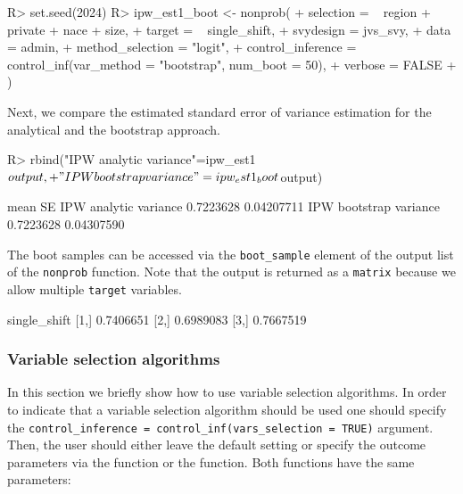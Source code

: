 \documentclass[
]{jss}
\begin{document}
\begin{CodeChunk}
\begin{CodeInput}
R> set.seed(2024)
R> ipw_est1_boot <- nonprob(
+   selection = ~ region + private + nace + size,
+   target = ~ single_shift,
+   svydesign = jvs_svy,
+   data = admin,
+   method_selection = "logit",
+   control_inference = control_inf(var_method = "bootstrap", num_boot = 50),
+   verbose = FALSE
+ )
\end{CodeInput}
\end{CodeChunk}

Next, we compare the estimated standard error of variance estimation for
the analytical and the bootstrap approach.

\begin{CodeChunk}
\begin{CodeInput}
R> rbind("IPW analytic variance"=ipw_est1$output,
+       "IPW bootstrap variance"=ipw_est1_boot$output)
\end{CodeInput}
\begin{CodeOutput}
                            mean         SE
IPW analytic variance  0.7223628 0.04207711
IPW bootstrap variance 0.7223628 0.04307590
\end{CodeOutput}
\end{CodeChunk}

The boot samples can be accessed via the \texttt{boot\_sample} element
of the output list of the \texttt{nonprob} function. Note that the
output is returned as a \texttt{matrix} because we allow multiple
\texttt{target} variables.

\begin{CodeChunk}
\begin{CodeOutput}
     single_shift
[1,]    0.7406651
[2,]    0.6989083
[3,]    0.7667519
\end{CodeOutput}
\end{CodeChunk}

\subsubsection{Variable selection
algorithms}\label{variable-selection-algorithms}

In this section we briefly show how to use variable selection
algorithms. In order to indicate that a variable selection algorithm
should be used one should specify the
\texttt{control\_inference\ =\ control\_inf(vars\_selection\ =\ TRUE)}
argument. Then, the user should either leave the default setting or
specify the outcome parameters via the  function or
the  function. Both functions have the same
parameters:
\end{document}
